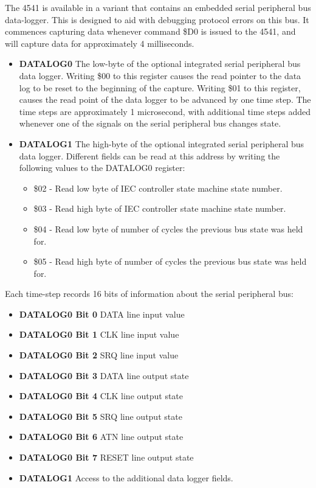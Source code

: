 The 4541 is available in a variant that contains an embedded serial
peripheral bus data-logger. This is designed to aid with debugging
protocol errors on this bus. It commences capturing data whenever
command \$D0 is issued to the 4541, and
will capture data for approximately 4 milliseconds.

\begin{itemize}
  \item {\bf DATALOG0} The low-byte of the optional integrated serial
    peripheral bus data logger.  Writing \$00 to this register causes
    the read pointer to the data log to be reset to the beginning of
    the capture. Writing \$01 to this register, causes the
    read point of the data logger to be advanced by one time step.
    The time steps are approximately 1 microsecond, with additional
    time steps added whenever one of the signals on the serial
    peripheral bus changes state.
    \item {\bf DATALOG1} The high-byte of the optional integrated serial
      peripheral bus data logger. Different fields can be read at this
      address by writing the following values to the DATALOG0
      register:
      \begin{itemize}
        \item \$02 - Read low byte of IEC controller state machine
          state number.
        \item \$03 - Read high byte of IEC controller state machine
          state number.
        \item \$04 - Read low byte of number of cycles the previous bus state
          was held for.
        \item \$05 - Read high byte of number of cycles the previous bus state
          was held for.
        \end{itemize}
\end{itemize}

Each time-step records 16 bits of information about the serial
peripheral bus:
\begin{itemize}
\item {\bf DATALOG0 Bit 0} DATA line input value
\item {\bf DATALOG0 Bit 1} CLK line input value
\item {\bf DATALOG0 Bit 2} SRQ line input value
\item {\bf DATALOG0 Bit 3} DATA line output state
\item {\bf DATALOG0 Bit 4} CLK line output state
\item {\bf DATALOG0 Bit 5} SRQ line output state
\item {\bf DATALOG0 Bit 6} ATN line output state
\item {\bf DATALOG0 Bit 7} RESET line output state
\item {\bf DATALOG1} Access to the additional data logger fields.
\end{itemize}

